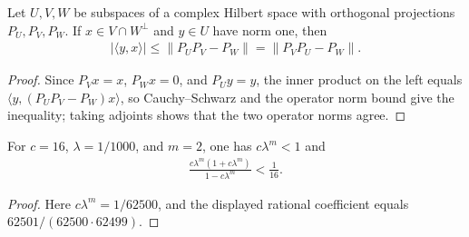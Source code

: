 \begin{lemma}
    \label{thm:fnw-projection-witness-bound}
    \leanok
    Let $U,V,W$ be subspaces of a complex Hilbert space with orthogonal
    projections $P_U,P_V,P_W$. If $x\in V\cap W^\perp$ and $y\in U$ have
    norm one, then
    \begin{align}
        |\langle y,x\rangle|\leq\|P_UP_V-P_W\|
        =\|P_VP_U-P_W\|.
    \end{align}
\end{lemma}
\begin{proof}\leanok
    Since $P_Vx=x$, $P_Wx=0$, and $P_Uy=y$, the inner product on the left
    equals $\langle y,(P_UP_V-P_W)x\rangle$, so Cauchy--Schwarz and the
    operator norm bound give the inequality; taking adjoints shows that the
    two operator norms agree.
\end{proof}

\begin{lemma}
    \label{thm:fnw-dimension-four-coefficient}
    \leanok
    For $c=16$, $\lambda=1/1000$, and $m=2$, one has $c\lambda^m<1$ and
    \begin{align}
        \frac{c\lambda^m(1+c\lambda^m)}{1-c\lambda^m}<\frac1{16}.
    \end{align}
\end{lemma}
\begin{proof}\leanok
    Here $c\lambda^m=1/62500$, and the displayed rational coefficient equals
    $62501/(62500\cdot62499)$.
\end{proof}

